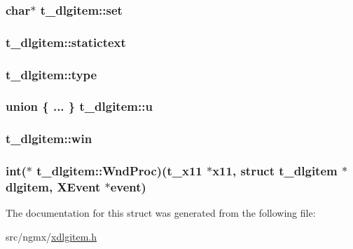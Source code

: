 \hypertarget{structt__dlgitem_a1085bac2b30966f5d2006d559e92779d}{
\subsubsection[{set}]{\setlength{\rightskip}{0pt plus 5cm}char$\ast$ {\bf t\-\_\-dlgitem\-::set}}}\label{structt__dlgitem_a1085bac2b30966f5d2006d559e92779d}
\hypertarget{structt__dlgitem_a6c434871e8289fbadf9fa02d50356c33}{
\subsubsection[{statictext}]{ {\bf t\-\_\-dlgitem\-::statictext}}}\label{structt__dlgitem_a6c434871e8289fbadf9fa02d50356c33}
\hypertarget{structt__dlgitem_a22d16008d103a5d358059b97b9c8e3be}{
\subsubsection[{type}]{ {\bf t\-\_\-dlgitem\-::type}}}\label{structt__dlgitem_a22d16008d103a5d358059b97b9c8e3be}
\hypertarget{structt__dlgitem_ad83bf0f5c6b971ca338cc7add3b23dc9}{
\subsubsection[{u}]{\setlength{\rightskip}{0pt plus 5cm}union \{ ... \}   {\bf t\-\_\-dlgitem\-::u}}}\label{structt__dlgitem_ad83bf0f5c6b971ca338cc7add3b23dc9}
\hypertarget{structt__dlgitem_ad97aed98f71ee50c25cad6f32ee705a0}{
\subsubsection[{win}]{ {\bf t\-\_\-dlgitem\-::win}}}\label{structt__dlgitem_ad97aed98f71ee50c25cad6f32ee705a0}
\hypertarget{structt__dlgitem_ae8a2419b3211094acc31c631e4799683}{
\subsubsection[{\-Wnd\-Proc}]{\setlength{\rightskip}{0pt plus 5cm}int($\ast$ {\bf t\-\_\-dlgitem\-::\-Wnd\-Proc})({\bf t\-\_\-x11} $\ast$x11, struct {\bf t\-\_\-dlgitem} $\ast$dlgitem, \-X\-Event $\ast$event)}}\label{structt__dlgitem_ae8a2419b3211094acc31c631e4799683}


\-The documentation for this struct was generated from the following file\-:\begin{DoxyCompactItemize}
\item 
src/ngmx/\hyperlink{xdlgitem_8h}{xdlgitem.\-h}\end{DoxyCompactItemize}
